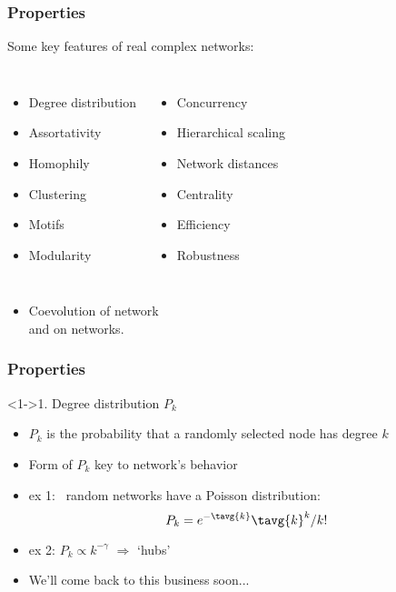 \begin{frame}
  \frametitle{Properties}

  \begin{block}{Some key features of real complex networks:}
  \begin{columns}
    \begin{itemize}
    \item Degree distribution
    \item Assortativity
    \item Homophily
    \item Clustering
    \item Motifs
    \item Modularity
    \end{itemize}
    \begin{itemize}
    \item Concurrency
    \item Hierarchical scaling
    \item Network distances
    \item Centrality
    \item Efficiency
    \item Robustness
    \end{itemize}
  \end{columns}
  \end{block}

  \begin{itemize}
  \item<1-> Coevolution of network 
    \\ and  on networks.
  \end{itemize}

\end{frame}

\begin{frame}
  \frametitle{Properties}

  \begin{block}<1->{1. Degree distribution $P_k$}
    \begin{itemize}
    \item<2->
      $P_k$ is the probability that a randomly selected
      node has degree $k$
    \item<3->
       Form of $P_k$ key to network's behavior
    \item<4->
      \alert{ex 1:}
      \erdosrenyi\ random networks have a Poisson
      distribution:
      $$ P_k = e^{-\tavg{k}} \tavg{k}^k / k! $$
    \item<5->
      \alert{ex 2:}
      $P_k \propto k^{-\gamma}$ $\Rightarrow$ `hubs'
    \item<5->
      We'll come back to this business soon...
    \end{itemize}
  \end{block}

\end{frame}

